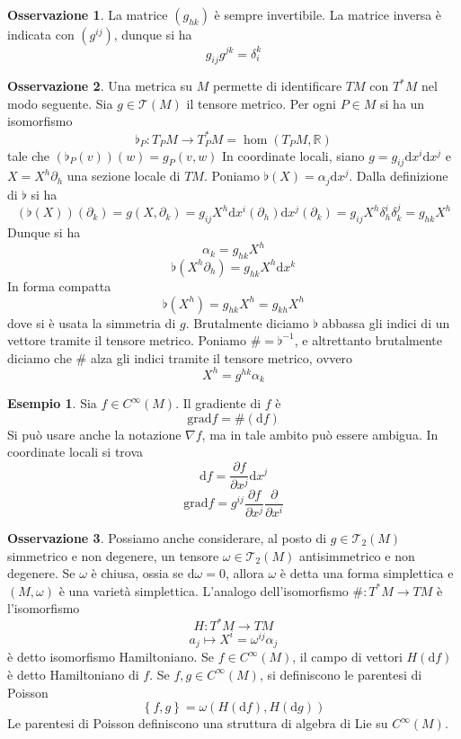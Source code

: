\documentclass[a4paper,11pt]{article}
\theoremstyle{definition}
\newtheorem{osservazione}{Osservazione}[section]
\newtheorem{esempio}{Esempio}[section]
\theoremstyle{theorem}
\newcommand{\dif}{\mathrm{d}}
\newcommand{\R}{\mathbb{R}}
\newcommand{\T}{\mathcal{T}}
\newcommand{\grad}{\textrm{grad}}
\begin{document}
\begin{osservazione}
	La matrice $\left(g_{hk}\right)$ è sempre invertibile. La matrice inversa è indicata con $\left(g^{ij}\right)$, dunque si ha
	\[g_{ij}g^{jk}=\delta^k_i\]
\end{osservazione}
\begin{osservazione}
	Una metrica su $M$ permette di identificare $TM$ con $T^*M$ nel modo seguente. Sia $g\in\T(M)$ il tensore metrico. Per ogni $P\in M$ si ha un isomorfismo
	\[\flat_P\colon T_PM\to T^*_PM=\hom\left(T_PM,\R\right)\]
	tale che $\left(\flat_P(v)\right)(w)=g_P(v,w)$
	In coordinate locali, siano $g=g_{ij}\dif x^i\dif x^j$ e $X=X^h\partial_h$ una sezione locale di $TM$. Poniamo $\flat(X)=\alpha_j\dif x^j$. Dalla definizione di $\flat$ si ha
	\[\left(\flat(X)\right)(\partial_k)=g(X,\partial_k)=g_{ij}X^h\dif x^i(\partial_h)\dif x^j(\partial_k)=g_{ij}X^h\delta^i_h\delta^j_k=g_{hk}X^h\]
	Dunque si ha
	\[\alpha_k=g_{hk}X^h\]
	\[\flat\left(X^h\partial_h\right)=g_{hk}X^h\dif x^k\]
	In forma compatta
	\[\flat\left(X^h\right)=g_{hk}X^h=g_{kh}X^h\]
	dove si è usata la simmetria di $g$. Brutalmente diciamo $\flat$ abbassa gli indici di un vettore tramite il tensore metrico. Poniamo $\#=\flat^{-1}$, e altrettanto brutalmente diciamo che $\#$ alza gli indici tramite il tensore metrico, ovvero
	\[X^h=g^{hk}\alpha_k\]
\end{osservazione}
\begin{esempio}
	Sia $f\in C^\infty(M)$. Il gradiente di $f$ è
	\[\grad f=\#\left(\dif f\right)\]
	Si può usare anche la notazione $\nabla f$, ma in tale ambito può essere ambigua. In coordinate locali si trova
	\[\dif f=\frac{\partial f}{\partial x^j}\dif x^j\]
	\[\grad f=g^{ij}\frac{\partial f}{\partial x^j}\frac{\partial}{\partial x^i}\]
\end{esempio}
\begin{osservazione}
	Possiamo anche considerare, al posto di $g\in\T_2(M)$ simmetrico e non degenere, un tensore $\omega\in\T_2(M)$ antisimmetrico e non degenere. Se $\omega$ è chiusa, ossia se $\dif \omega=0$, allora $\omega$ è detta una forma simplettica e $(M,\omega)$ è una varietà simplettica. L'analogo dell'isomorfismo $\#\colon T^*M\to TM$ è l'isomorfismo
	\[H\colon T^*M\to TM\]
	\[a_j\mapsto X^i=\omega^{ij}\alpha_j\]
	è detto isomorfismo Hamiltoniano. Se $f\in C^\infty(M)$, il campo di vettori $H(\dif f)$ è detto Hamiltoniano di $f$. Se $f,g\in C^\infty(M)$, si definiscono le parentesi di Poisson
	\[\left\{f,g\right\}=\omega\left(H(\dif f),H(\dif g)\right)\]
	Le parentesi di Poisson definiscono una struttura di algebra di Lie su $C^\infty(M)$.
\end{osservazione}
\end{document}
